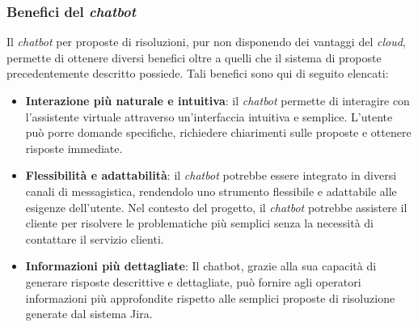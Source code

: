 \subsubsection{Benefici del \textit{chatbot}}
Il \textit{chatbot} per proposte di risoluzioni,  pur non disponendo dei vantaggi del \textit{cloud}, permette di ottenere diversi benefici oltre a quelli che il sistema di proposte precedentemente descritto possiede. Tali benefici sono qui di seguito elencati:
\begin{itemize}
    \item \textbf{Interazione più naturale e intuitiva}: il \textit{chatbot} permette di interagire con l'assistente virtuale attraverso un'interfaccia intuitiva e semplice. L'utente può porre domande specifiche, richiedere chiarimenti sulle proposte e ottenere risposte immediate.
    \item \textbf{Flessibilità e adattabilità}: il \textit{chatbot} potrebbe essere integrato in diversi canali di messagistica, rendendolo uno strumento flessibile e adattabile alle esigenze dell'utente. Nel contesto del progetto, il \textit{chatbot} potrebbe assistere il cliente per risolvere le problematiche più semplici senza la necessità di contattare il servizio clienti.
    \item \textbf{Informazioni più dettagliate}: Il chatbot, grazie alla sua capacità di generare risposte descrittive e dettagliate, può fornire agli operatori informazioni più approfondite rispetto alle semplici proposte di risoluzione generate dal sistema Jira.
\end{itemize}

